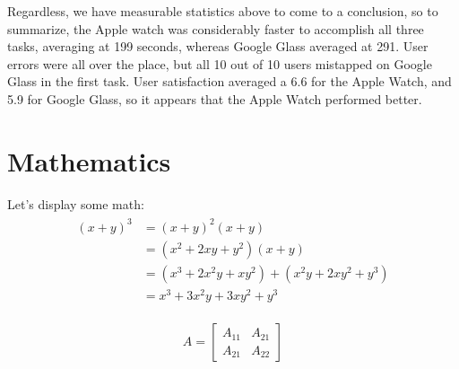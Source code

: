 \documentclass[paper=a4, fontsize=11pt]{scrartcl}	%
\numberwithin{equation}{section}															%
\numberwithin{figure}{section}																%
\numberwithin{table}{section}																%
\begin{document}
Regardless, we have measurable statistics above to come to a conclusion, so to summarize, the Apple watch was considerably faster to accomplish all three tasks, averaging at 199 seconds, whereas Google Glass averaged at 291. User errors were all over the place, but all 10 out of 10 users mistapped on Google Glass in the first task. User satisfaction averaged a 6.6 for the Apple Watch, and 5.9 for Google Glass, so it appears that the Apple Watch performed better. 



\section{Mathematics}
Let's display some math:
\begin{align} 
	\begin{split}
	(x+y)^3 	&= (x+y)^2(x+y)\\
					&=(x^2+2xy+y^2)(x+y)\\
					&=(x^3+2x^2y+xy^2) + (x^2y+2xy^2+y^3)\\
					&=x^3+3x^2y+3xy^2+y^3
	\end{split}					
\end{align}

\begin{align}
	A = 
	\begin{bmatrix}
	A_{11} & A_{21} \\
  	A_{21} & A_{22}
	\end{bmatrix}
\end{align}
\end{document}
